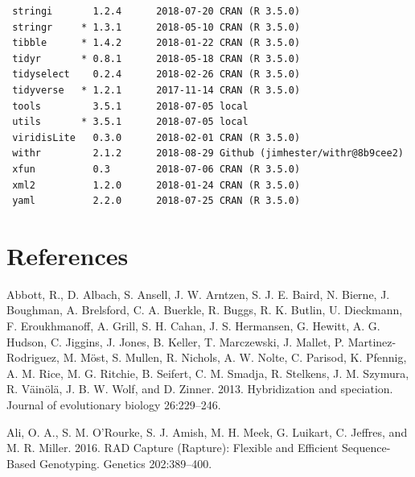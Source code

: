 \documentclass[proquest,12pt,final]{ucthesis-CA2012} %
\begin{document}
\begin{ucmainmatter}
\begin{verbatim}
 stringi       1.2.4      2018-07-20 CRAN (R 3.5.0)                       
 stringr     * 1.3.1      2018-05-10 CRAN (R 3.5.0)                       
 tibble      * 1.4.2      2018-01-22 CRAN (R 3.5.0)                       
 tidyr       * 0.8.1      2018-05-18 CRAN (R 3.5.0)                       
 tidyselect    0.2.4      2018-02-26 CRAN (R 3.5.0)                       
 tidyverse   * 1.2.1      2017-11-14 CRAN (R 3.5.0)                       
 tools         3.5.1      2018-07-05 local                                
 utils       * 3.5.1      2018-07-05 local                                
 viridisLite   0.3.0      2018-02-01 CRAN (R 3.5.0)                       
 withr         2.1.2      2018-08-29 Github (jimhester/withr@8b9cee2)     
 xfun          0.3        2018-07-06 CRAN (R 3.5.0)                       
 xml2          1.2.0      2018-01-24 CRAN (R 3.5.0)                       
 yaml          2.2.0      2018-07-25 CRAN (R 3.5.0)                       
\end{verbatim}
\backmatter

\hypertarget{references}{%
\chapter*{References}\label{references}}


\noindent

\setlength{\parindent}{-0.20in}
\setlength{\leftskip}{0.20in}
\setlength{\parskip}{8pt}

\hypertarget{refs}{}
\leavevmode\hypertarget{ref-abbott_hybridization_2013}{}%
Abbott, R., D. Albach, S. Ansell, J. W. Arntzen, S. J. E. Baird, N.
Bierne, J. Boughman, A. Brelsford, C. A. Buerkle, R. Buggs, R. K.
Butlin, U. Dieckmann, F. Eroukhmanoff, A. Grill, S. H. Cahan, J. S.
Hermansen, G. Hewitt, A. G. Hudson, C. Jiggins, J. Jones, B. Keller, T.
Marczewski, J. Mallet, P. Martinez-Rodriguez, M. Möst, S. Mullen, R.
Nichols, A. W. Nolte, C. Parisod, K. Pfennig, A. M. Rice, M. G. Ritchie,
B. Seifert, C. M. Smadja, R. Stelkens, J. M. Szymura, R. Väinölä, J. B.
W. Wolf, and D. Zinner. 2013. Hybridization and speciation. Journal of
evolutionary biology 26:229--246.

\leavevmode\hypertarget{ref-ali_rad_2016}{}%
Ali, O. A., S. M. O'Rourke, S. J. Amish, M. H. Meek, G. Luikart, C.
Jeffres, and M. R. Miller. 2016. RAD Capture (Rapture): Flexible and
Efficient Sequence-Based Genotyping. Genetics 202:389--400.


\end{ucmainmatter}
\end{document}
